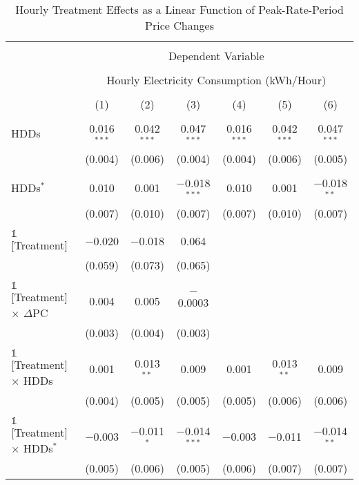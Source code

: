 
\begin{table}[!htbp] \centering 
  \caption{Hourly Treatment Effects as a Linear Function of Peak-Rate-Period Price Changes} 
  \label{Table:Hourly-ATEs-as-a-Linear-Function-of-Peak-Rate-Period-Price-Changes_For-Appendix} 
\small 
\begin{tabular}{@{\extracolsep{95pt}}lcccccc} 
\\[-1.8ex]\hline 
\hline \\[-1.8ex] 
 & \multicolumn{6}{c}{Dependent Variable} \\ 
\cline{2-7} 
\\[-1.8ex] & \multicolumn{6}{c}{Hourly Electricity Consumption  (kWh/Hour)} \\ 
\\[-1.8ex] & (1) & (2) & (3) & (4) & (5) & (6)\\ 
\hline \\[-1.8ex] 
 HDDs & 0.016$^{***}$ & 0.042$^{***}$ & 0.047$^{***}$ & 0.016$^{***}$ & 0.042$^{***}$ & 0.047$^{***}$ \\ 
  & (0.004) & (0.006) & (0.004) & (0.004) & (0.006) & (0.005) \\ 
  & & & & & & \\ 
 HDDs$^{*}$ & 0.010 & 0.001 & $-$0.018$^{***}$ & 0.010 & 0.001 & $-$0.018$^{**}$ \\ 
  & (0.007) & (0.010) & (0.007) & (0.007) & (0.010) & (0.007) \\ 
  & & & & & & \\ 
 $\mathbb{1}$[Treatment] & $-$0.020 & $-$0.018 & 0.064 &  &  &  \\ 
  & (0.059) & (0.073) & (0.065) &  &  &  \\ 
  & & & & & & \\ 
 $\mathbb{1}$[Treatment] $\times$ $\Delta$PC & 0.004 & 0.005 & $-$0.0003 &  &  &  \\ 
  & (0.003) & (0.004) & (0.003) &  &  &  \\ 
  & & & & & & \\ 
 $\mathbb{1}$[Treatment] $\times$ HDDs & 0.001 & 0.013$^{**}$ & 0.009 & 0.001 & 0.013$^{**}$ & 0.009 \\ 
  & (0.004) & (0.005) & (0.005) & (0.005) & (0.006) & (0.006) \\ 
  & & & & & & \\ 
 $\mathbb{1}$[Treatment] $\times$ HDDs$^{*}$ & $-$0.003 & $-$0.011$^{*}$ & $-$0.014$^{***}$ & $-$0.003 & $-$0.011 & $-$0.014$^{**}$ \\ 
  & (0.005) & (0.006) & (0.005) & (0.006) & (0.007) & (0.007) \\ 

\end{tabular}
\end{table}
